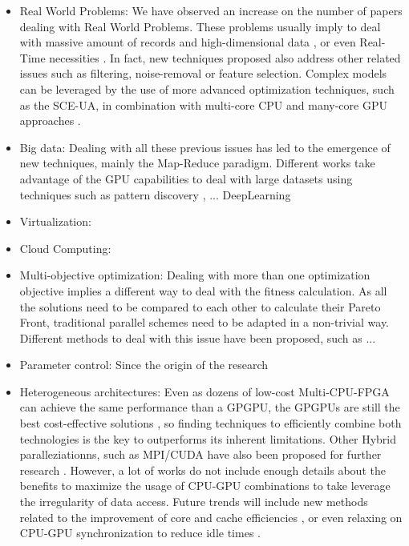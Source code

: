 \documentclass{article}
\begin{document}
\begin{itemize}

\item Real World Problems: We have observed an increase on the number of papers dealing with Real World Problems. These problems usually imply to deal with massive amount of records and high-dimensional data \cite{Hwang7470556}, or even Real-Time necessities \cite{Maggiani2018}. In fact, new techniques proposed also address other related issues such as filtering, noise-removal or feature selection. Complex models can be leveraged by the use of more advanced optimization techniques, such as the SCE-UA, in combination with multi-core CPU and many-core GPU approaches \cite{Kan17SCEUA}.

\item Big data: Dealing with all these previous issues has led to the emergence of new techniques, mainly the Map-Reduce paradigm. Different works take advantage of the GPU capabilities to deal with large datasets using techniques such as pattern discovery \cite{Djenouri2017b},  ... DeepLearning \cite{Gadea-Girones2018} 

\item Virtualization: %

\item Cloud Computing:


\item Multi-objective optimization: Dealing with more than one optimization objective implies a different way to deal with the fitness calculation. As all the solutions need to be compared to each other to calculate their Pareto Front, traditional parallel schemes need to be adapted in a non-trivial way. Different methods to deal with this issue have been proposed, such as ...

\item Parameter control: Since the origin of the research 



\item Heterogeneous architectures: Even as dozens of low-cost Multi-CPU-FPGA can achieve the same performance than a GPGPU, the GPGPUs are still the best cost-effective solutions \cite{Gadea-Girones2018}, so finding techniques to efficiently combine both technologies is the key to outperforms its inherent limitations. Other Hybrid paralleziationns, such as MPI/CUDA have also been proposed for further research \cite{Jurczuk2017}. However, a lot of works do not include enough details about the benefits to maximize the usage of CPU-GPU combinations to take leverage the irregularity of data access. Future trends will include new methods related to the improvement of core and cache efficiencies \cite{Escobar17GPUCPU}, or even relaxing on CPU-GPU synchronization to reduce idle times \cite{Rey2018}. 


\end{itemize}
\end{document}
